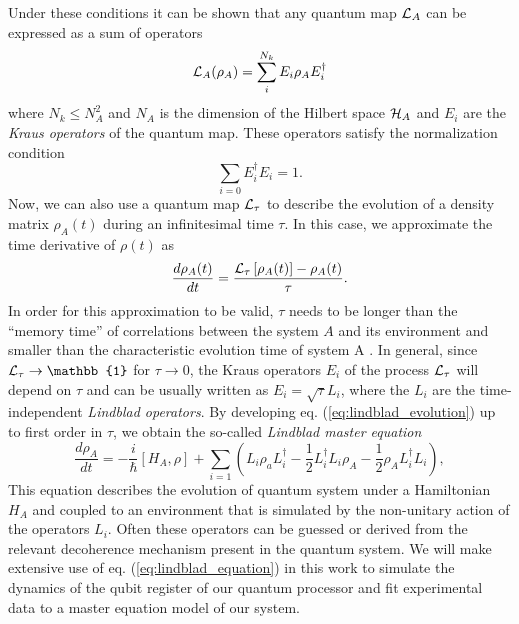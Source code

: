 Under these conditions it can be shown that any quantum map $\LA{A}$ can be expressed as a sum of operators \citep{kraus_states_1983}
%
\begin{equation}
\LA{A}(\rho_A) = \sum\limits_i^{N_k} E_i \rho_A E_i^\dagger \label{eq:kraus_representation}
\end{equation}
%
where $N_k \le N_A^2$ and $N_A$ is the dimension of the Hilbert space $\begin{mathcal}H\end{mathcal}_A$ and $E_i$ are the {\it Kraus operators} of the quantum map. These operators satisfy the normalization condition
%
\begin{equation}
\sum\limits_{i=0} E_i^\dagger E_i = \mathrm{1}.
\end{equation}
%
Now, we can also use a quantum map $\LA{\tau}$ to describe the evolution of a density matrix $\rho_A(t)$ during an infinitesimal time $\tau$. In this case, we approximate the time derivative of $\rho(t)$ as
%
\begin{equation}
\frac{d\rho_A(t)}{dt}=\frac{\LA{\tau}\left[\rho_A(t)\right]-\rho_A(t)}{\tau}. \label{eq:lindblad_evolution}
\end{equation}
%
In order for this approximation to be valid, $\tau$ needs to be longer than the ``memory time'' of correlations between the system $A$ and its environment and smaller than the characteristic evolution time of system A \citep{haroche_exploring_2006}. In general, since $\LA{\tau}\to \mathbb{1}$ for $\tau\to 0$, the Kraus operators $E_i$ of the process $\LA{\tau}$ will depend on $\tau$ and can be usually written as $E_i = \sqrt{\tau} L_i$, where the $L_i$ are the time-independent {\it Lindblad operators}. By developing eq. (\ref{eq:lindblad_evolution}) up to first order in $\tau$, we obtain the so-called {\it Lindblad master equation}
%
\begin{equation}
\frac{d\rho_A}{dt} = -\frac{i}{\hbar}[H_A,\rho]+\sum\limits_{i = 1}\left(L_i\rho_aL_i^\dagger-\frac{1}{2}L_i^\dagger L_i\rho_A-\frac{1}{2}\rho_A L_i^\dagger L_i\right), \label{eq:lindblad_equation}
\end{equation}
%
This equation describes the evolution of quantum system under a Hamiltonian $H_A$ and coupled to an environment that is simulated by the non-unitary action of the operators $L_i$. Often these operators can be guessed or derived from the relevant decoherence mechanism present in the quantum system. We will make extensive use of eq. (\ref{eq:lindblad_equation}) in this work to simulate the dynamics of the qubit register of our quantum processor and fit experimental data to a master equation model of our system.


